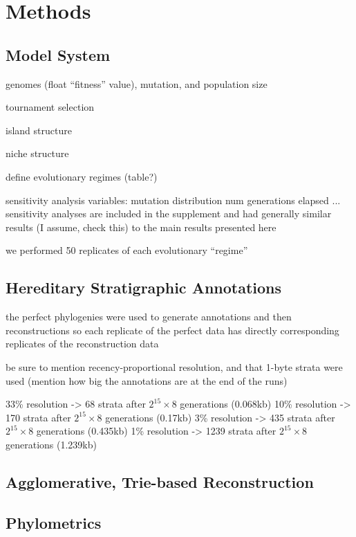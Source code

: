 \section{Methods} \label{sec:methods}

\subsection{Model System}

genomes (float ``fitness'' value), mutation, and population size

tournament selection

island structure

niche structure

define evolutionary regimes (table?)

sensitivity analysis variables:
mutation distribution
num generations elapsed
... sensitivity analyses are included in the supplement and had generally similar results (I assume, check this) to the main results presented here

we performed 50 replicates of each evolutionary ``regime''

\subsection{Hereditary Stratigraphic Annotations}

the perfect phylogenies were used to generate annotations and then reconstructions so each replicate of the perfect data has directly corresponding replicates of the reconstruction data

be sure to mention recency-proportional resolution, and that 1-byte strata were used (mention how big the annotations are at the end of the runs)

33\% resolution -> 68 strata after $2^{15} \times 8$ generations (0.068kb)
10\% resolution -> 170 strata after $2^{15} \times 8$ generations (0.17kb)
3\% resolution -> 435 strata after $2^{15} \times 8$ generations (0.435kb)
1\% resolution -> 1239 strata after $2^{15} \times 8$ generations (1.239kb)


\subsection{Agglomerative, Trie-based Reconstruction}

\subsection{Phylometrics}

